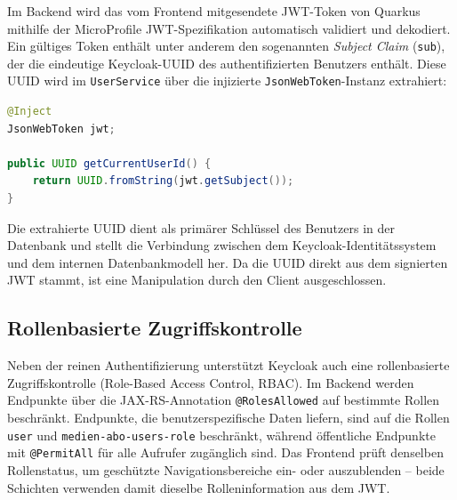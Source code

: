 Im Backend wird das vom Frontend mitgesendete JWT-Token von Quarkus mithilfe
der MicroProfile JWT-Spezifikation automatisch validiert und dekodiert. Ein
gültiges Token enthält unter anderem den sogenannten \textit{Subject Claim}
(\texttt{sub}), der die eindeutige Keycloak-UUID des authentifizierten Benutzers
enthält. Diese UUID wird im \texttt{UserService} über die injizierte
\texttt{JsonWebToken}-Instanz extrahiert:

\begin{lstlisting}[language=java, caption={Extraktion der Benutzer-UUID aus dem JWT im UserService}]
@Inject
JsonWebToken jwt;

public UUID getCurrentUserId() {
    return UUID.fromString(jwt.getSubject());
}
\end{lstlisting}

Die extrahierte UUID dient als primärer Schlüssel des Benutzers in der
Datenbank und stellt die Verbindung zwischen dem Keycloak-Identitätssystem
und dem internen Datenbankmodell her. Da die UUID direkt aus dem signierten
JWT stammt, ist eine Manipulation durch den Client ausgeschlossen.

\subsection{Rollenbasierte Zugriffskontrolle}

Neben der reinen Authentifizierung unterstützt Keycloak auch eine
rollenbasierte Zugriffskontrolle (Role-Based Access Control, RBAC). Im
Backend werden Endpunkte über die JAX-RS-Annotation \texttt{@RolesAllowed}
auf bestimmte Rollen beschränkt. Endpunkte, die benutzerspezifische Daten
liefern, sind auf die Rollen \texttt{user} und \texttt{medien-abo-users-role}
beschränkt, während öffentliche Endpunkte mit \texttt{@PermitAll} für alle
Aufrufer zugänglich sind. Das Frontend prüft denselben Rollenstatus, um
geschützte Navigationsbereiche ein- oder auszublenden -- beide Schichten
verwenden damit dieselbe Rolleninformation aus dem JWT.